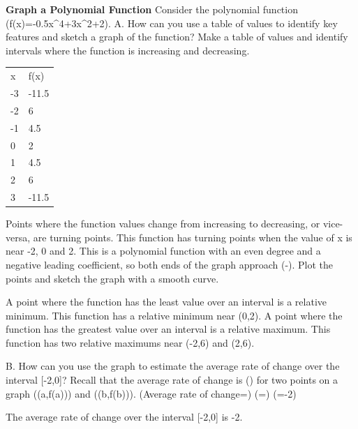 \documentclass{article}
\newenvironment{example}[1]{}{}         %
\newcommand{\answer}[1]{}               %
\newcommand{\placeholder}[2]{}          %
\newcommand{\te}[1]{}                   %
\begin{document}
\begin{example}{3}
\textbf{Graph a Polynomial Function}
Consider the polynomial function (f(x)=-0.5x^4+3x^2+2).
A. How can you use a table of values to identify key features and sketch a graph of the function?
Make a table of values and identify intervals where the function is increasing and decreasing.
\begin{tabular}{ll}
x & f(x) \\
-3 & -11.5 \\
-2 & 6 \\
-1 & 4.5 \\
0 & 2 \\
1 & 4.5 \\
2 & 6 \\
3 & -11.5 \\
\end{tabular}
\te{Table braces: increasing from -3 to -2; decreasing from -2 to 0; increasing from 0 to 2; decreasing from 2 to 3.}
Points where the function values change from increasing to decreasing, or vice-versa, are turning points. This function has turning points when the value of x is near -2, 0 and 2.
This is a polynomial function with an even degree and a negative leading coefficient, so both ends of the graph approach (-\infty).
Plot the points and sketch the graph with a smooth curve.
\placeholder{graph}{Red quartic f(x)=-0.5x^4+3x^2+2 on pale blue square grid. Axes x,y with arrows; x labels -4,-2,O,2,4; y labels 2,4,6; unit grid; visible window approximately x=[-5,5],y=[-2,8]. Filled red plotted points (-2,6),(-1,4.5),(0,2),(1,4.5),(2,6); two maxima slightly above 6 near x=+-1.73 and minimum (0,2). Both ends descend with arrows near x=+-2.6.}
A point where the function has the least value over an interval is a relative minimum. This function has a relative minimum near (0,2).
A point where the function has the greatest value over an interval is a relative maximum. This function has two relative maximums near (-2,6) and (2,6).
\answer{A. Turning points near (-2,6), (0,2), and (2,6); both ends approach (-\infty). See graph.}
B. How can you use the graph to estimate the average rate of change over the interval [-2,0]?
Recall that the average rate of change is () for two points on a graph ((a,f(a))) and ((b,f(b))).
(Average rate of change=)
(=)
(=-2)
\te{Callout: Substitute (-2,6) and (0,2).}
The average rate of change over the interval [-2,0] is -2.
\answer{B. -2}
\te{USE APPROPRIATE TOOLS It can be very difficult to locate the precise turning points and zeros of polynomial functions from a table of values. But using a spreadsheet and more decimal places may help.}
\end{example}
\end{document}
